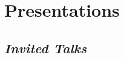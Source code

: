 \documentclass{article}[10pt]
\begin{document}











\section*{Presentations}

\subsection*{\emph{Invited Talks}}
\end{document}
